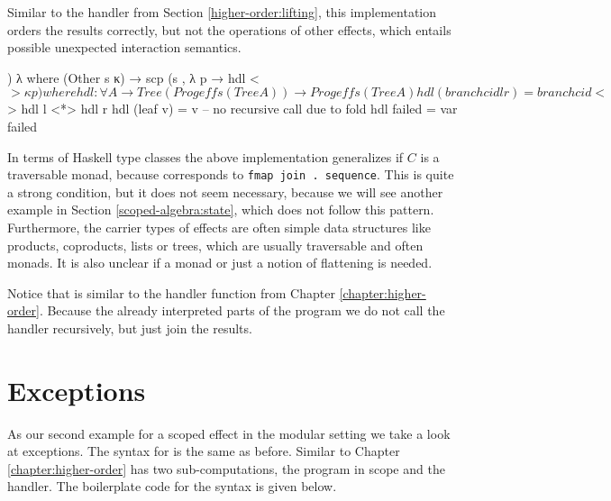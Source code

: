 \begin{AgdaAlign}
Similar to the handler from Section \ref{higher-order:lifting}, this
implementation orders the results correctly, but not the operations of other
effects, which entails possible unexpected interaction semantics.

\begin{code}
  ) λ where
    (Other s κ)  → scp (s , λ p → hdl <$> κ p)
  where
    hdl : ∀ {A} → Tree (Prog effs (Tree A)) → Prog effs (Tree A)
    hdl (branch cid l r)  = branch cid <$> hdl l <*> hdl r
    hdl (leaf v)          = v -- no recursive call due to fold
    hdl failed            = var failed
\end{code}
\end{AgdaAlign}
In terms of Haskell type classes the above implementation generalizes if $C$ is
a traversable monad, because  corresponds to
\texttt{fmap join . sequence}.
This is quite a strong condition, but it does not seem necessary, because we
will see another example in Section \ref{scoped-algebra:state}, which does not
follow this pattern.
Furthermore, the carrier types of effects are often simple data structures like
products, coproducts, lists or trees, which are usually traversable and often
monads.
It is also unclear if a monad or just a notion of flattening is needed.


Notice that  is similar to the handler function from
Chapter \ref{chapter:higher-order}.
Because the  already interpreted parts of the program we do
not call the handler recursively, but just join the results.


\section{Exceptions}

As our second example for a scoped effect in the modular setting we take a look
at exceptions.
The syntax for  is the same as before.
Similar to Chapter \ref{chapter:higher-order}  has two
sub-computations, the program in scope and the handler.
The boilerplate code for the syntax is given below.

